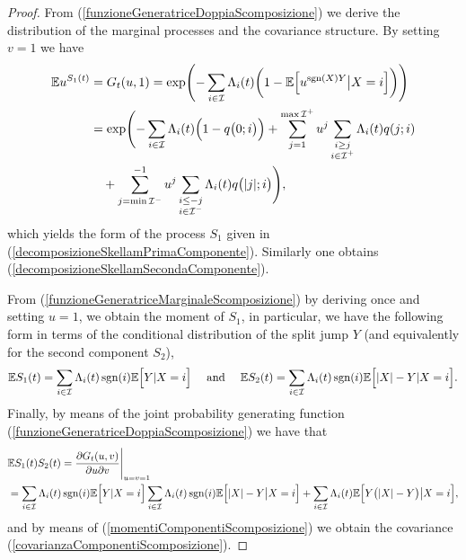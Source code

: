 \documentclass[12pt, twoside, english, headsepline]{article}
\theoremstyle{definition} %
\numberwithin{equation}{section} %
\begin{document}
\begin{proof}
	From (\ref{funzioneGeneratriceDoppiaScomposizione}) we derive the distribution of the marginal processes and the covariance structure.
	By setting $v=1$ we have
	\begin{align}
		\mathbb{E}u^{S_1(t)} &= G_t(u,1) =  \text{exp}\Biggl(- \sum_{i\in\mathcal{I}}\Lambda_i(t)\biggl(1- \mathbb{E}\Bigl[u^{\text{sgn}(X)Y}\big|X=i\Bigr]\biggr)\Biggr)\label{funzioneGeneratriceMarginaleScomposizione}\\
		& =  \text{exp}\Biggl(- \sum_{i\in\mathcal{I}}\Lambda_i(t)\Bigl(1 - q\big(0 ;i\big)\Bigr) + \sum_{j=1}^{\max\mathcal{I}^+} u^j \sum_{\substack{i\ge j\\ i\in\mathcal{I}^+}} \Lambda_i(t)q(j;i) \nonumber \\
		&\ \ \ + \sum_{j=\min\mathcal{I}^-}^{-1} u^j \sum_{\substack{i\le -j\\ i\in\mathcal{I}^-}} \Lambda_i(t)q\big(|j|;i\big) \Biggr),\nonumber
	\end{align}
	which yields the form of the process $S_1$ given in (\ref{decomposizioneSkellamPrimaComponente}). Similarly one obtains (\ref{decomposizioneSkellamSecondaComponente}).
	
	From (\ref{funzioneGeneratriceMarginaleScomposizione}) by deriving once and setting $u=1$, we obtain the moment of $S_1$, in particular, we have the following form in terms of the conditional distribution of the split jump $Y$ (and equivalently for the second component $S_2$),
	\begin{equation}\label{momentiComponentiScomposizione}
		\mathbb{E}S_1(t) = \sum_{i\in\mathcal{I}} \Lambda_i(t)\,\text{sgn}(i) \mathbb{E}\Bigl[Y|X=i\Bigr]\ \ \ \text{ and }\ \ \  \mathbb{E}S_2(t) = \sum_{i\in\mathcal{I}} \Lambda_i(t)\,\text{sgn}(i) \mathbb{E}\Bigl[|X|-Y|X=i\Bigr].
	\end{equation}
	Finally, by means of the joint probability generating function (\ref{funzioneGeneratriceDoppiaScomposizione}) we have that 
	\begin{align*}
		&\mathbb{E}S_1(t)S_2(t) = \frac{\partial G_t(u,v)}{\partial u\partial v}\Bigg|_{u=v=1} \\
		&= \sum_{i\in\mathcal{I}} \Lambda_i(t)\,\text{sgn}(i) \mathbb{E}\Bigl[Y|X=i\Bigr]\sum_{i\in\mathcal{I}} \Lambda_i(t) \,\text{sgn}(i)\mathbb{E}\Bigl[|X|-Y\big|X=i\Bigr] + \sum_{i\in\mathcal{I}} \Lambda_i(t) \mathbb{E}\Bigl[Y\bigl(|X|-Y\big)\big|X=i\Bigr],
	\end{align*}
	and by means of (\ref{momentiComponentiScomposizione}) we obtain the covariance (\ref{covarianzaComponentiScomposizione}).
\end{proof}
\end{document}
